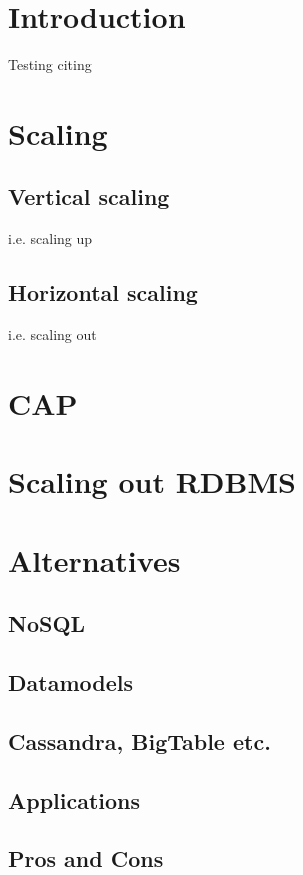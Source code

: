 \documentclass[twoside]{utathesis}
\begin{document}

\prelimpages

\titlepage

\setcounter{page}{-1}

\tableofcontents

\textpages
 
\chapter{Introduction}
Testing citing \cite{brewer}

\chapter{Scaling}
\section{Vertical scaling}
i.e. scaling up
\section{Horizontal scaling}
i.e. scaling out

\chapter{CAP}

\chapter{Scaling out RDBMS}

\chapter{Alternatives}
\section{NoSQL}
\section{Datamodels}
\section{Cassandra, BigTable etc.}
\section{Applications}
\section{Pros and Cons}






\label{end-of-document}
\end{document}
